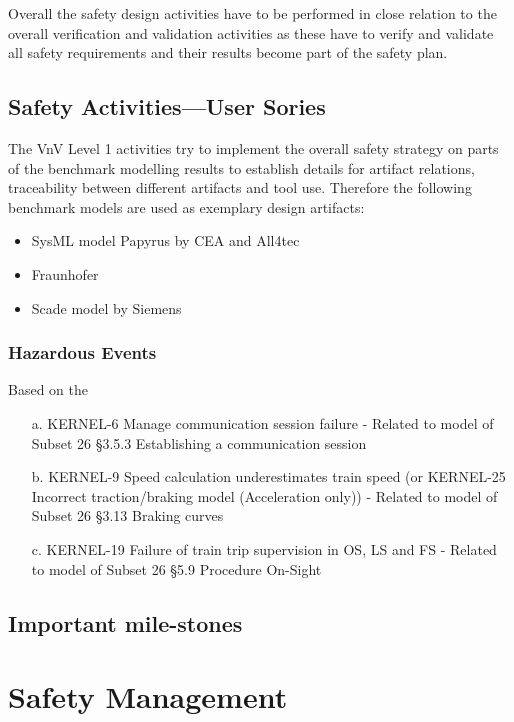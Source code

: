 \documentclass{template/openetcs_report}
\begin{document}
Overall the safety design activities have to be performed in close relation to the overall verification and validation activities as these have to verify and validate all safety requirements and their results become part of the safety plan.

\subsection{Safety Activities---User Sories}
\label{sec:safety-activ-user}

The VnV Level 1 activities try to implement the overall safety strategy on parts of the benchmark modelling results to establish details for artifact relations, traceability between different artifacts and tool use. Therefore the following benchmark models are used as exemplary design artifacts:

\begin{itemize}
\item SysML model Papyrus by CEA and All4tec

\item Fraunhofer

\item Scade model by Siemens
\end{itemize}

\subsubsection{Hazardous Events}

Based on the 
\begin{itemize}
\item [a.] KERNEL-6  Manage communication session failure - Related to model of Subset 26 §3.5.3 Establishing a communication session
\item [b.] KERNEL-9  Speed calculation underestimates train speed (or KERNEL-25  Incorrect traction/braking model (Acceleration only)) - Related to model of Subset 26 §3.13 Braking curves
\item [c.] KERNEL-19  Failure of train trip supervision in OS, LS and FS - Related to model of Subset 26 §5.9 Procedure On-Sight
\end{itemize}


\subsection{Important mile-stones}

\section{Safety Management}
\end{document}
